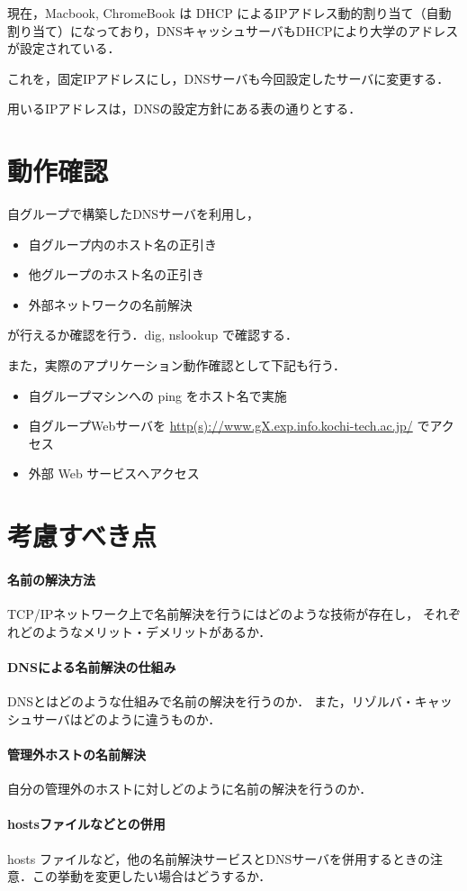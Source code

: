 現在，Macbook, ChromeBook は DHCP によるIPアドレス動的割り当て（自動割り当て）になっており，DNSキャッシュサーバもDHCPにより大学のアドレスが設定されている．

これを，固定IPアドレスにし，DNSサーバも今回設定したサーバに変更する．

用いるIPアドレスは，DNSの設定方針にある表の通りとする．


\section{動作確認}
 自グループで構築したDNSサーバを利用し，
 \begin{itemize}
     \item 自グループ内のホスト名の正引き
     \item 他グループのホスト名の正引き
     \item 外部ネットワークの名前解決
 \end{itemize}
 が行えるか確認を行う．dig, nslookup で確認する．

また，実際のアプリケーション動作確認として下記も行う．
 \begin{itemize}
     \item 自グループマシンへの ping をホスト名で実施
     \item 自グループWebサーバを \url{http(s)://www.gX.exp.info.kochi-tech.ac.jp/} でアクセス
     \item 外部 Web サービスへアクセス
 \end{itemize}

 
\section{考慮すべき点}
\paragraph{名前の解決方法}
			TCP/IPネットワーク上で名前解決を行うにはどのような技術が存在し，
			それぞれどのようなメリット・デメリットがあるか．
\paragraph{DNSによる名前解決の仕組み}
		DNSとはどのような仕組みで名前の解決を行うのか．
		また，リゾルバ・キャッシュサーバはどのように違うものか．
\paragraph{管理外ホストの名前解決}
		自分の管理外のホストに対しどのように名前の解決を行うのか．
\paragraph{hostsファイルなどとの併用}
	hosts ファイルなど，他の名前解決サービスとDNSサーバを併用するときの注意．この挙動を変更したい場合はどうするか．
 
